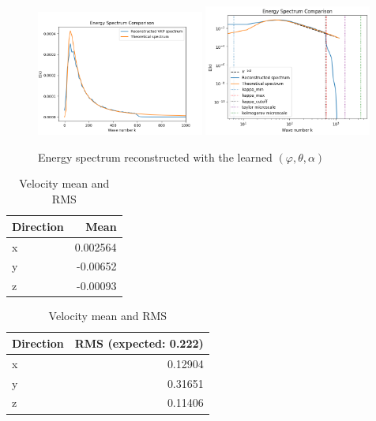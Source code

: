 \documentclass[11pt]{beamer}
\begin{document}
\begin{frame}
  \begin{figure}
    \centering
    \includegraphics[width=0.49\textwidth]{illustrations/Energy_Spectrum_VKP.png}
    \includegraphics[width=0.49\textwidth]{illustrations/EnergySpectrumTrained.png}
    \caption{Energy spectrum reconstructed with the learned $(\varphi,\theta,\alpha)$}
  \end{figure}

   \begin{table}
    \centering
    \begin{tabular}{lr}
      \toprule
      \textbf{Direction} & \textbf{Mean} \\
      \midrule
      x & 0.002564 \\
      y & -0.00652 \\
      z & -0.00093 \\
      \bottomrule
    \end{tabular}
    \qquad
    \begin{tabular}{lr}
      \toprule
      \textbf{Direction} & \textbf{RMS (expected: 0.222)} \\
      \midrule
      x & 0.12904 \\
      y & 0.31651 \\
      z & 0.11406 \\
      \bottomrule
    \end{tabular}
    \caption{Velocity mean and RMS}
  \end{table}
\end{frame}
\end{document}
